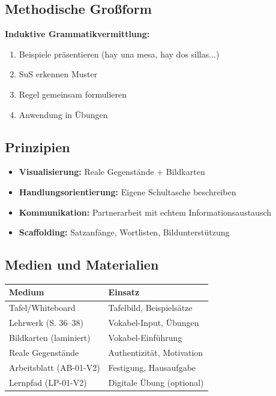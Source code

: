 \documentclass[11pt,a4paper]{article}
\begin{document}
\subsection{Methodische Großform}

\textbf{Induktive Grammatikvermittlung:}
\begin{enumerate}
    \item Beispiele präsentieren (hay una mesa, hay dos sillas...)
    \item SuS erkennen Muster
    \item Regel gemeinsam formulieren
    \item Anwendung in Übungen
\end{enumerate}

\subsection{Prinzipien}

\begin{itemize}
    \item \textbf{Visualisierung:} Reale Gegenstände + Bildkarten
    \item \textbf{Handlungsorientierung:} Eigene Schultasche beschreiben
    \item \textbf{Kommunikation:} Partnerarbeit mit echtem Informationsaustausch
    \item \textbf{Scaffolding:} Satzanfänge, Wortlisten, Bildunterstützung
\end{itemize}

\subsection{Medien und Materialien}

\begin{tabular}{|l|l|}
\hline
\textbf{Medium} & \textbf{Einsatz} \\
\hline
Tafel/Whiteboard & Tafelbild, Beispielsätze \\
Lehrwerk (S. 36--38) & Vokabel-Input, Übungen \\
Bildkarten (laminiert) & Vokabel-Einführung \\
Reale Gegenstände & Authentizität, Motivation \\
Arbeitsblatt (AB-01-V2) & Festigung, Hausaufgabe \\
Lernpfad (LP-01-V2) & Digitale Übung (optional) \\
\hline
\end{tabular}
\end{document}
